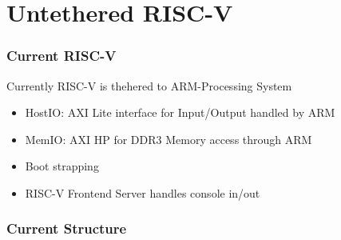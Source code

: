 \documentclass{beamer}
\begin{document}
\section{Untethered RISC-V}
\begin{frame}
	\frametitle{Current RISC-V}
	Currently RISC-V is thehered to ARM-Processing System
	\begin{itemize}
	\item HostIO: AXI Lite interface for Input/Output handled by ARM
	\item MemIO: AXI HP for DDR3 Memory access through ARM
	\item Boot strapping
	\item RISC-V Frontend Server handles console in/out
	\end{itemize}
\end{frame}

\begin{frame}
	\frametitle{Current Structure}
	\begin{figure}[!h]
		\begin{center}
	\end{center}
	\end{figure}
\end{frame}
\end{document}
